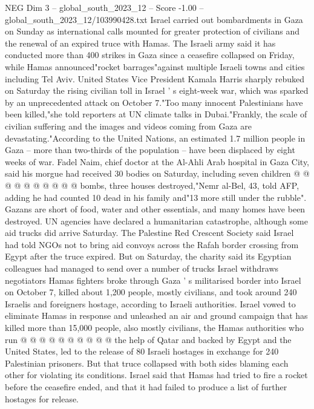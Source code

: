 \begin{textsample}{NEG Dim 3 – global\_south\_2023\_12 – Score -1.00 – global\_south\_2023\_12/103990428.txt}  \label{ex:f3_neg_036}
Israel carried out bombardments in Gaza on Sunday as international calls mounted for greater protection of civilians and the renewal of an expired truce with Hamas.
The Israeli army said it has conducted more than 400 strikes in Gaza since a ceasefire collapsed on Friday, while Hamas announced"rocket barrages"against multiple Israeli towns and cities including Tel Aviv.
United States Vice President Kamala Harris sharply rebuked on Saturday the rising civilian toll in Israel ' s eight-week war, which was sparked by an unprecedented attack on October 7."Too many innocent Palestinians have been killed,"she told reporters at UN climate talks in Dubai."Frankly, the scale of civilian suffering and the images and videos coming from Gaza are devastating."According to the United Nations, an estimated 1.7 million people in Gaza -- more than two-thirds of the population -- have been displaced by eight weeks of war.
Fadel Naim, chief doctor at the Al-Ahli Arab hospital in Gaza City, said his morgue had received 30 bodies on Saturday, including seven children @ @ @ @ @ @ @ @ @ @ bombs, three houses destroyed,"Nemr al-Bel, 43, told AFP, adding he had counted 10 dead in his family and"13 more still under the rubble".
Gazans are short of food, water and other essentials, and many homes have been destroyed.
UN agencies have declared a humanitarian catastrophe, although some aid trucks did arrive Saturday.
The Palestine Red Crescent Society said Israel had told NGOs not to bring aid convoys across the Rafah border crossing from Egypt after the truce expired.
But on Saturday, the charity said its Egyptian colleagues had managed to send over a number of trucks Israel withdraws negotiators Hamas fighters broke through Gaza ' s militarised border into Israel on October 7, killed about 1,200 people, mostly civilians, and took around 240 Israelis and foreigners hostage, according to Israeli authorities.
Israel vowed to eliminate Hamas in response and unleashed an air and ground campaign that has killed more than 15,000 people, also mostly civilians, the Hamas authorities who run @ @ @ @ @ @ @ @ @ @ the help of Qatar and backed by Egypt and the United States, led to the release of 80 Israeli hostages in exchange for 240 Palestinian prisoners.
But that truce collapsed with both sides blaming each other for violating its conditions.
Israel said that Hamas had tried to fire a rocket before the ceasefire ended, and that it had failed to produce a list of further hostages for release.

\end{textsample}
